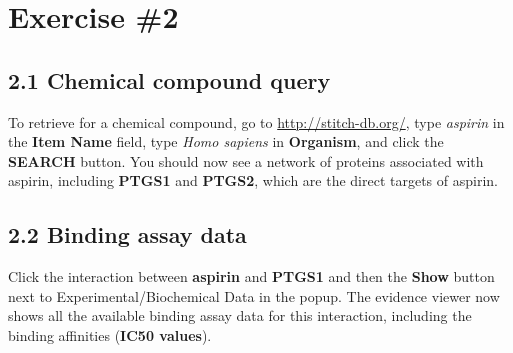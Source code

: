 \documentclass[a4paper]{article}
\begin{document}
\section*{Exercise \#2}

\vspace{0,5cm}

\subsection*{2.1 Chemical compound query}
To retrieve for a chemical compound, go to \url{http://stitch-db.org/}, type \textit{aspirin} in the \textbf{Item Name} field, type \textit{Homo sapiens} in \textbf{Organism}, and click the \textbf{SEARCH} button. You should now see a network of proteins associated with aspirin, including \textbf{PTGS1} and \textbf{PTGS2}, which are the direct targets of aspirin.
\vspace{0,5cm}

\subsection*{2.2 Binding assay data}

Click the interaction between \textbf{aspirin} and \textbf{PTGS1} and then the \textbf{Show} button next to Experimental/Biochemical Data in the popup. The evidence viewer now shows all the available binding assay data for this interaction, including the binding affinities (\textbf{IC50 values}).
\end{document}
